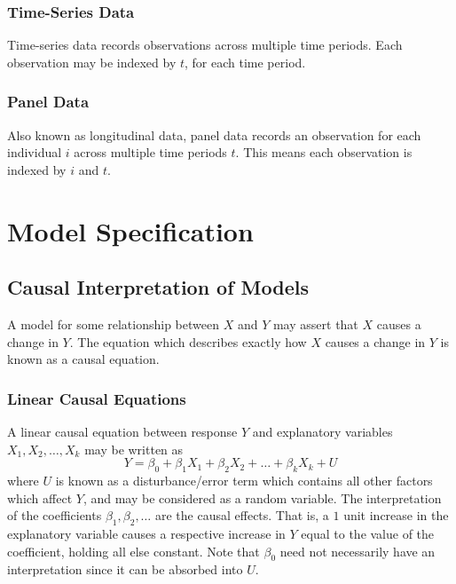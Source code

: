\documentclass[11pt]{report} %
\begin{document}
\subsubsection{Time-Series Data}

Time-series data records observations across multiple time periods. Each observation may be indexed by $t$, for each time period.

\subsubsection{Panel Data}

Also known as longitudinal data, panel data records an observation for each individual $i$ across multiple time periods $t$. This means each observation is indexed by $i$ and $t$.

\section{Model Specification}

\subsection{Causal Interpretation of Models}

A model for some relationship between $X$ and $Y$ may assert that $X$ causes a change in $Y$. The equation which describes exactly how $X$ causes a change in $Y$ is known as a causal equation.

\subsubsection{Linear Causal Equations}

A linear causal equation between response $Y$ and explanatory variables $X_{1}, X_{2}, \dots, X_{k}$ may be written as
\begin{equation}
Y = \beta_{0} + \beta_{1}X_{1} + \beta_{2}X_{2} + \dots + \beta_{k}X_{k} + U
\end{equation}
where $U$ is known as a disturbance/error term which contains all other factors which affect $Y$, and may be considered as a random variable. The interpretation of the coefficients $\beta_{1}, \beta_{2}, \dots$ are the causal effects. That is, a $1$ unit increase in the explanatory variable causes a respective increase in $Y$ equal to the value of the coefficient, holding all else constant. Note that $\beta_{0}$ need not necessarily have an interpretation since it can be absorbed into $U$.
\end{document}
